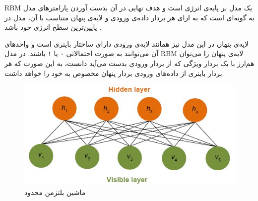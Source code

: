 RBM
	یک مدل بر پایه‌ی انرژی است و هدف نهایی در آن بدست آوردن پارامتر‌های مدل به گونه‌ای است که به ازای هر بردار داده‌ی ورودی و لایه‌ی پنهان متناسب با آن، مدل در پایین‌ترین سطح انرژی خود باشد
	\cite{hinton2010practical}.
% 
	
	 لایه‌ی پنهان در این مدل نیز همانند لایه‌ی ورودی دارای ساختار باینری است و واحد‌های آن می‌‌توانند به صورت احتمالاتی ۰ یا ۱ باشند. در مدل
RBM
	لایه‌ی پنهان را می‌‌توان هم‌ارز با یک بردار ویژگی‌ که از بردار ورودی بدست می‌‌آید دانست، به این صورت که هر بردار باینری از‌ داده‌های ورودی
	بردار پنهان مخصوص به خود را خواهد داشت.
\begin{figure}[!t]
	\centering
	\includegraphics[scale=0.5]{chap3-img/RBM}
	\caption{ماشین بلتزمن محدود}
	\label{chap3-fig1}
\end{figure}

